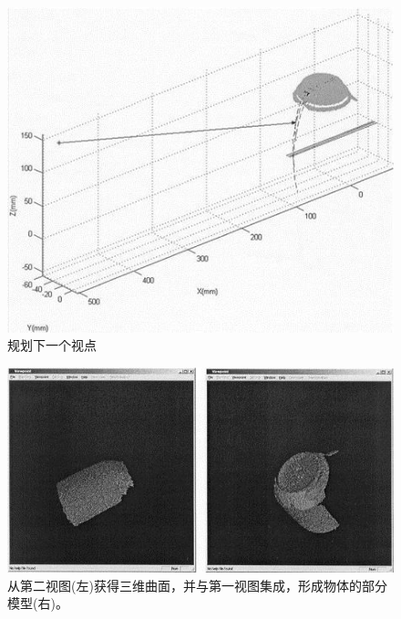 \documentclass[AutoFakeBold,zihao=-4]{ctexart}
\begin{document}
	\begin{figure}[H]
		\centering
		\includegraphics[scale=0.9]{PIC11}
		\caption{规划下一个视点}
		\label{fig-11}
	\end{figure}

	\begin{figure}[H]
		\centering
		\includegraphics[scale=0.9]{PIC12}
		\caption{从第二视图(左)获得三维曲面，并与第一视图集成，形成物体的部分模型(右)。}
		\label{fig-12}
	\end{figure}
\end{document}
